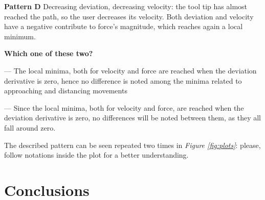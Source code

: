 \documentclass[conference]{IEEEtran}
\begin{document}
\textbf{Pattern D }  Decreasing deviation, decreasing velocity: the
tool tip has almost reached the path, so the user decreases its
velocity. Both deviation and velocity have a negative contribute to
force’s magnitude, which reaches again a local minimum. 


\textbf{Which one of these two?}

--- The local minima, both for velocity and force are reached when the
deviation derivative is zero, hence no difference is noted among the
minima related to approaching and distancing movements

--- Since the local minima, both for velocity and force, are reached
when the deviation derivative is zero, no differences will be noted
between them, as they all fall around zero.


The described pattern can be seen repeated two times in \textit{Figure
\ref{fig:plots}}: please, follow notations inside the plot for a
better understanding.

\section{Conclusions}



\end{document}

